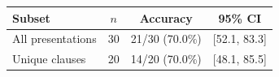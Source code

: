 \begin{tabular}{lccc}
\toprule
Subset & $n$ & Accuracy & 95\% CI \\
\midrule
All presentations & 30 & 21/30 (70.0\%) & [52.1, 83.3] \\
Unique clauses & 20 & 14/20 (70.0\%) & [48.1, 85.5] \\
\bottomrule
\end{tabular}
